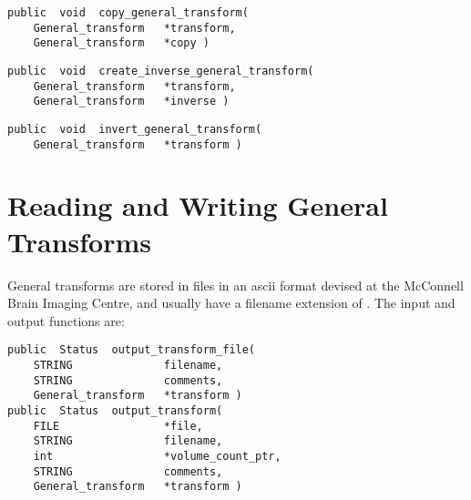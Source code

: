 
{\bf\begin{verbatim}
public  void  copy_general_transform(
    General_transform   *transform,
    General_transform   *copy )
\end{verbatim}}


{\bf\begin{verbatim}
public  void  create_inverse_general_transform(
    General_transform   *transform,
    General_transform   *inverse )
\end{verbatim}}


{\bf\begin{verbatim}
public  void  invert_general_transform(
    General_transform   *transform )
\end{verbatim}}


\section{Reading and Writing General Transforms}

General transforms are stored in files in an ascii format devised at
the McConnell Brain Imaging Centre, and usually have a filename
extension of .  The input and output functions are:

{\bf\begin{verbatim}
public  Status  output_transform_file(
    STRING              filename,
    STRING              comments,
    General_transform   *transform )
public  Status  output_transform(
    FILE                *file,
    STRING              filename,
    int                 *volume_count_ptr,
    STRING              comments,
    General_transform   *transform )
\end{verbatim}}

